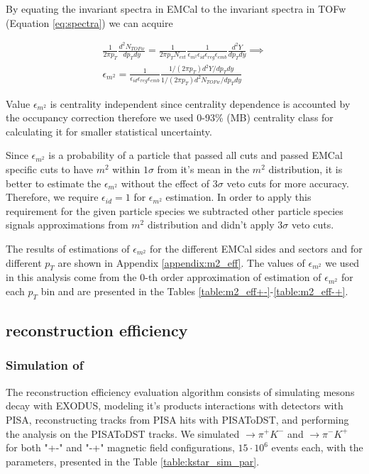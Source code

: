 By equating the invariant spectra in EMCal to the invariant spectra in TOFw (Equation \ref{eq:spectra}) we can acquire

\begin{multline}
	\frac{1}{2\pi p_T}\frac{d^2N_{TOFw}}{dp_T dy} = 
	\frac{1}{2 \pi p_T N_{evt}}\frac{1}{\epsilon_{m^2}\epsilon_{id}\epsilon_{reg}\epsilon_{emb}}\frac{d^2Y}{dp_T dy} \implies \\
	\epsilon_{m^2} = \frac{1}{\epsilon_{id}\epsilon_{reg}\epsilon_{emb}} \frac{1/(2\pi p_T) d^2 Y/dp_T dy}{1/(2\pi p_T) d^2 N_{TOFw}/dp_T dy}
	\label{eq:equating_inv_spectra}
\end{multline} 

Value $\epsilon_{m^2}$ is centrality independent since centrality dependence is accounted by the occupancy correction therefore we used 0-93\% (MB) centrality class for calculating it for smaller statistical uncertainty.

Since $\epsilon_{m^2}$ is a probability of a particle that passed all cuts and passed EMCal specific cuts to have $m^2$ within $1\sigma$ from it's mean in the $m^2$ distribution, it is better to estimate the $\epsilon_{m^2}$ without the effect of $3\sigma$ veto cuts for more accuracy. Therefore, we require $\epsilon_{id} = 1$ for $\epsilon_{m^2}$ estimation. In order to apply this requirement for the given particle species we subtracted other particle species signals approximations from $m^2$ distribution and didn't apply $3\sigma$ veto cuts.

The results of estimations of $\epsilon_{m^2}$ for the different EMCal sides and sectors and for different $p_T$ are shown in Appendix \ref{appendix:m2_eff}. The values of $\epsilon_{m^2}$ we used in this analysis come from the 0-th order approximation of estimation of $\epsilon_{m^2}$ for each $p_T$ bin and are presented in the Tables \ref{table:m2_eff+-}-\ref{table:m2_eff-+}.



\subsection{\Kstar reconstruction efficiency}

\subsubsection{Simulation of \Kstar}

The reconstruction efficiency evaluation algorithm consists of simulating \Kstar mesons decay with EXODUS, modeling it's products interactions with detectors with PISA, reconstructing tracks from PISA hits with PISAToDST, and performing the analysis on the PISAToDST tracks. We simulated \Kstar$\rightarrow \pi^+ K^-$ and \Kstar$\rightarrow \pi^- K^+$ for both "+-" and "-+" magnetic field configurations, $15 \cdot 10^6$ events each, with the parameters, presented in the Table \ref{table:kstar_sim_par}.

